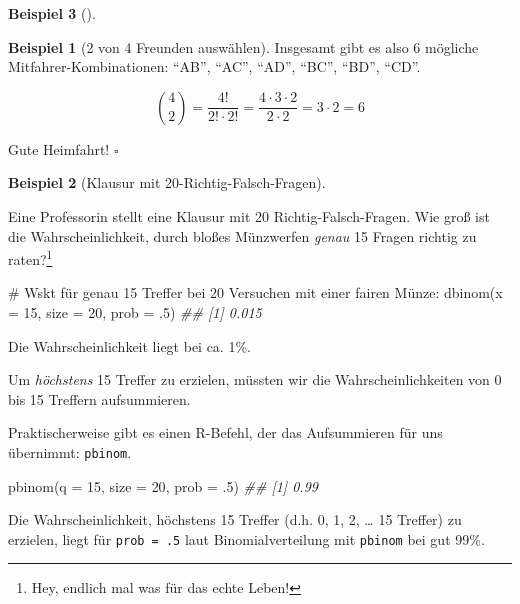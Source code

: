 \documentclass[
  ngerman,
  letterpaper,
  twoside,
  open=any]{scrbook}
\newenvironment{Shaded}{\begin{snugshade}}{\end{snugshade}}
\newcommand{\AttributeTok}[1]{\textcolor[rgb]{0.40,0.45,0.13}{#1}}
\newcommand{\CommentTok}[1]{\textcolor[rgb]{0.37,0.37,0.37}{#1}}
\newcommand{\DecValTok}[1]{\textcolor[rgb]{0.68,0.00,0.00}{#1}}
\newcommand{\DocumentationTok}[1]{\textcolor[rgb]{0.37,0.37,0.37}{\textit{#1}}}
\newcommand{\FunctionTok}[1]{\textcolor[rgb]{0.28,0.35,0.67}{#1}}
\newcommand{\NormalTok}[1]{\textcolor[rgb]{0.00,0.23,0.31}{#1}}
\theoremstyle{definition}
\newtheorem{example}{Beispiel}[chapter]
\theoremstyle{plain}
\theoremstyle{definition}
\theoremstyle{definition}
\theoremstyle{remark}
\begin{document}
\begin{example}[]
\begin{example}[2 von 4 Freunden
auswählen]
Insgesamt gibt es also 6 mögliche Mitfahrer-Kombinationen: \enquote{AB},
\enquote{AC}, \enquote{AD}, \enquote{BC}, \enquote{BD}, \enquote{CD}.

\[\binom{4}{2} = \frac{4!} {2! \cdot 2!} = \frac{4\cdot 3 \cdot 2}{2 \cdot 2} = 3 \cdot 2 = 6\]

Gute Heimfahrt! \(\square\)

\end{example}

\begin{example}[Klausur mit
20-Richtig-Falsch-Fragen]\protect\hypertarget{exm-klausur20}{}\label{exm-klausur20}

Eine Professorin stellt eine Klausur mit 20 Richtig-Falsch-Fragen. Wie
groß ist die Wahrscheinlichkeit, durch bloßes Münzwerfen \emph{genau} 15
Fragen richtig zu raten?\footnote{Hey, endlich mal was für das echte
  Leben!}

\begin{Shaded}
\begin{Highlighting}[]
\CommentTok{\# Wskt für genau 15 Treffer bei 20 Versuchen mit einer fairen Münze:}
\FunctionTok{dbinom}\NormalTok{(}\AttributeTok{x =} \DecValTok{15}\NormalTok{, }\AttributeTok{size =} \DecValTok{20}\NormalTok{, }\AttributeTok{prob =}\NormalTok{ .}\DecValTok{5}\NormalTok{)}
\DocumentationTok{\#\# [1] 0.015}
\end{Highlighting}
\end{Shaded}

Die Wahrscheinlichkeit liegt bei ca. 1\%.

Um \emph{höchstens} 15 Treffer zu erzielen, müssten wir die
Wahrscheinlichkeiten von 0 bis 15 Treffern aufsummieren.

Praktischerweise gibt es einen R-Befehl, der das Aufsummieren für uns
übernimmt: \texttt{pbinom}.

\begin{Shaded}
\begin{Highlighting}[]
\FunctionTok{pbinom}\NormalTok{(}\AttributeTok{q =} \DecValTok{15}\NormalTok{, }\AttributeTok{size =} \DecValTok{20}\NormalTok{, }\AttributeTok{prob =}\NormalTok{ .}\DecValTok{5}\NormalTok{)}
\DocumentationTok{\#\# [1] 0.99}
\end{Highlighting}
\end{Shaded}

Die Wahrscheinlichkeit, höchstens 15 Treffer (d.h. 0, 1, 2, \ldots{} 15
Treffer) zu erzielen, liegt für \texttt{prob\ =\ .5} laut
Binomialverteilung mit \texttt{pbinom} bei gut 99\%.


\end{example}
\end{example}
\end{document}
